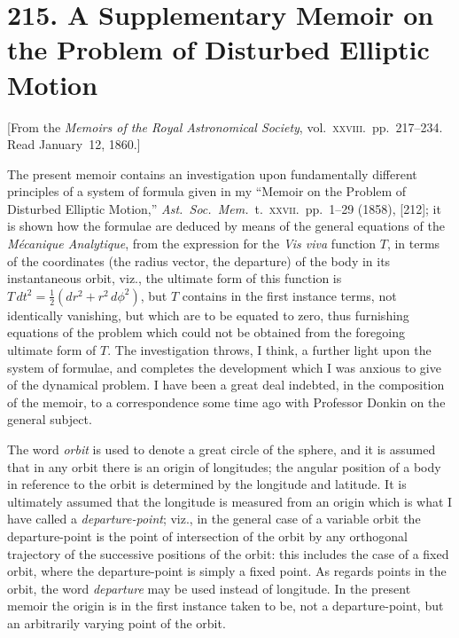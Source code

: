\documentclass[12pt,a4paper]{article}
\theoremstyle{plain}
\begin{document}

\newpage
\section*{215. A Supplementary Memoir on the Problem of Disturbed Elliptic Motion}


\begin{center}
[From the \textit{Memoirs of the Royal Astronomical Society}, vol.~\textsc{xxviii}.\ pp.~217--234.\\
Read January~12, 1860.]
\end{center}

\medskip
The present memoir contains an investigation upon fundamentally different principles of a system of formula given in my ``Memoir on the Problem of Disturbed Elliptic Motion,'' \textit{Ast.\ Soc.\ Mem.}\ t.~\textsc{xxvii}.\ pp.~1--29 (1858), [212]; it is shown how the formulae are deduced by means of the general equations of the \textit{M\'ecanique Analytique}, from the expression for the \textit{Vis viva} function $T$, in terms of the coordinates (the radius vector, the departure) of the body in its instantaneous orbit, viz., the ultimate form of this function is $T\,dt^{2}=\tfrac{1}{2}(dr^{2}+r^{2}\,d\phi^{2})$, but $T$ contains in the first instance terms, not identically vanishing, but which are to be equated to zero, thus furnishing equations of the problem which could not be obtained from the foregoing ultimate form of $T$. The investigation throws, I think, a further light upon the system of formulae, and completes the development which I was anxious to give of the dynamical problem. I have been a great deal indebted, in the composition of the memoir, to a correspondence some time ago with Professor Donkin on the general subject.

\medskip
The word \textit{orbit} is used to denote a great circle of the sphere, and it is assumed that in any orbit there is an origin of longitudes; the angular position of a body in reference to the orbit is determined by the longitude and latitude. It is ultimately assumed that the longitude is measured from an origin which is what I have called a \textit{departure-point}; viz., in the general case of a variable orbit the departure-point is the point of intersection of the orbit by any orthogonal trajectory of the successive positions of the orbit: this includes the case of a fixed orbit, where the departure-point is simply a fixed point. As regards points in the orbit, the word \textit{departure} may be used instead of longitude. In the present memoir the origin is in the first instance taken to be, not a departure-point, but an arbitrarily varying point of the orbit.
\end{document}
